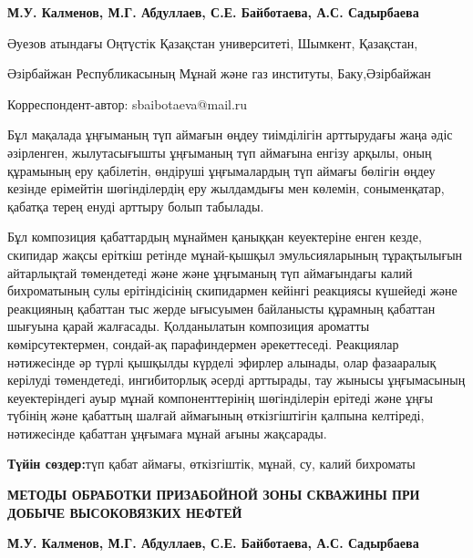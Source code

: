 
\begin{header}

{\bfseries
{}М.У. Калменов,
М.Г. Абдуллаев,
С.Е. Байботаева\envelope,
А.С. Садырбаева
}
\end{header}

\begin{affil}
Әуезов атындағы Оңтүстік Қазақстан университеті, Шымкент, Қазақстан,

Әзірбайжан Республикасының Мұнай және газ институты, Баку,Әзірбайжан

\envelope Корреспондент-автор: sbaibotaeva@mail.ru
\end{affil}

Бұл мақалада ұңғыманың түп аймағын өңдеу тиімділігін арттырудағы жаңа
әдіс әзірленген, жылутасығышты ұңғыманың түп аймағына енгізу арқылы,
оның құрамының еру қабілетін, өндіруші ұңғымалардың түп аймағы бөлігін
өңдеу кезінде ерімейтін шөгінділердің еру жылдамдығы мен көлемін,
соныменқатар, қабатқа терең енуді арттыру болып табылады.

Бұл композиция қабаттардың мұнаймен қаныққан кеуектеріне енген кезде,
скипидар жақсы еріткіш ретінде мұнай-қышқыл эмульсияларының тұрақтылығын
айтарлықтай төмендетеді және және ұңғыманың түп аймағындағы калий
бихроматының сулы ерітіндісінің скипидармен кейінгі реакциясы күшейеді
және реакцияның қабаттан тыс жерде ығысуымен байланысты құрамның
қабаттан шығуына қарай жалғасады. Қолданылатын композиция ароматты
көмірсутектермен, сондай-ақ парафиндермен әрекеттеседі. Реакциялар
нәтижесінде әр түрлі қышқылды күрделі эфирлер алынады, олар фазааралық
керілуді төмендетеді, ингибиторлық әсерді арттырады, тау жынысы
ұңғымасының кеуектеріндегі ауыр мұнай компоненттерінің шөгінділерін
ерітеді және ұңғы түбінің және қабаттың шалғай аймағының өткізгіштігін
қалпына келтіреді, нәтижесінде қабаттан ұңғымаға мұнай ағыны жақсарады.

{\bfseries Түйін сөздер:}түп қабат аймағы, өткізгіштік, мұнай, су, калий
бихроматы

\begin{header}
{\bfseries МЕТОДЫ ОБРАБОТКИ ПРИЗАБОЙНОЙ ЗОНЫ СКВАЖИНЫ ПРИ ДОБЫЧЕ ВЫСОКОВЯЗКИХ НЕФТЕЙ}

{\bfseries
{}М.У. Калменов,
М.Г. Абдуллаев,
С.Е. Байботаева\envelope,
А.С. Садырбаева
}
\end{header}

